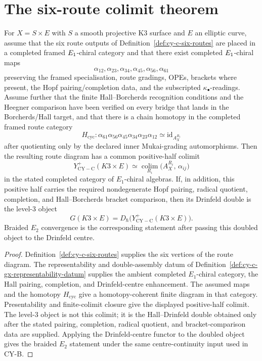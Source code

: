 \section{The six-route colimit theorem}
\label{sec:cy-c-statement}

\begin{theorem}
\label{thm:six-routes-isomorphism}
For $X = S \times E$ with $S$ a smooth projective K3 surface and $E$ an
elliptic curve, assume that the six route outputs of
Definition~\ref{def:cy-c-six-routes} are placed in a completed framed
\(E_{1}\)-chiral category and that there exist completed
\(E_{1}\)-chiral maps
\[
 \alpha_{12},\alpha_{23},\alpha_{34},\alpha_{45},\alpha_{56},\alpha_{61}
\]
preserving the framed specialisation, route gradings, OPEs, brackets
where present, the Hopf pairing/completion data, and the subscripted
\(\kappa_\bullet\)-readings. Assume further that the finite
Hall--Borcherds recognition conditions and the Heegner comparison have been
verified on every bridge that lands in the Borcherds/Hall target, and
that there is a chain
homotopy in the completed framed route category
\[
 H_{\mathrm{cyc}}\colon
 \alpha_{61}\alpha_{56}\alpha_{45}\alpha_{34}\alpha_{23}\alpha_{12}
 \simeq \mathrm{id}_{A_X^{R_1}}
\]
after quotienting only by the declared inner Mukai-grading
automorphisms. Then the resulting route diagram has a common positive-half
colimit
\[
 Y^+_{\mathrm{CY-C}}(K3\times E)
 \simeq
 \operatorname*{colim}_{R_i}
 \bigl(A_X^{R_i},\,\alpha_{ij}\bigr)
\]
in the stated completed category of \(E_1\)-chiral algebras. If, in
addition, this positive half carries the required nondegenerate Hopf
pairing, radical quotient, completion, and Hall--Borcherds bracket
comparison, then its Drinfeld double is the level-\(3\) object
\[
 G(K3\times E) = D_\hbar\bigl(Y^+_{\mathrm{CY-C}}(K3\times E)\bigr).
\]
Braided \(E_2\) convergence is the corresponding statement after
passing this doubled object to the Drinfeld centre.
\end{theorem}

\begin{proof}
Definition~\ref{def:cy-c-six-routes} supplies the six vertices of the
route diagram. The representability and double-assembly datum
of Definition~\ref{def:cy-c-gx-representability-datum} supplies the
ambient completed \(E_1\)-chiral category, the Hall pairing, completion,
and Drinfeld-centre enhancement. The assumed maps and the homotopy
\(H_{\mathrm{cyc}}\) give a homotopy-coherent finite diagram in that
category. Presentability and finite-colimit closure give the displayed
positive-half colimit. The level-\(3\) object is not this colimit; it is
the Hall--Drinfeld double obtained only after the stated pairing,
completion, radical quotient, and bracket-comparison data are supplied.
Applying the Drinfeld-centre functor to the doubled object gives the
braided \(E_2\) statement under the same centre-continuity input used in
CY-B.
\end{proof}

